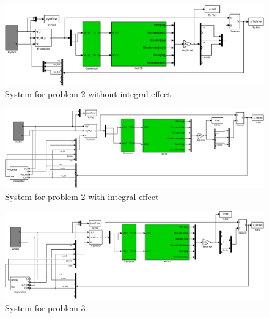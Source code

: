 \begin{figure}[H]
    \begin{center}
        \includegraphics[width=1\linewidth]{Part4_pictures/simulink/p4p2sys.eps} 
        \caption{System for problem 2 without integral effect}
        \label{p4p2noint}
    \end{center}
\end{figure}

\begin{figure}[H]
    \begin{center}
        \includegraphics[width=1\linewidth]{Part4_pictures/simulink/p4p2sys_int.eps} 
        \caption{System for problem 2 with integral effect}
        \label{p4p2int}
    \end{center}
\end{figure}

\begin{figure}[H]
    \begin{center}
        \includegraphics[width=1\linewidth]{Part4_pictures/simulink/p4p3sys.eps} 
        \caption{System for problem 3}
        \label{p4p3}
    \end{center}
\end{figure}


